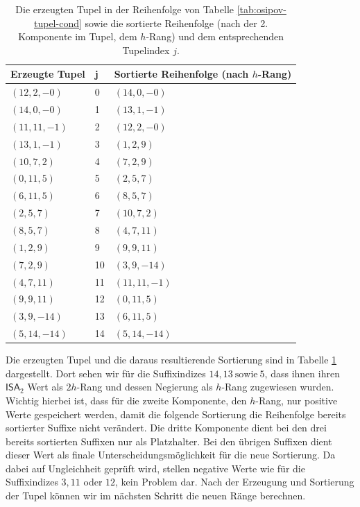 \begin{table}[]
\begin{tabular}{|l|l|l|}
\hline
Erzeugte Tupel & j  & Sortierte Reihenfolge (nach $h$-Rang) \\ \hline
$(12, 2, -0)$  & 0  & $(14,0,-0)$                           \\ \hline
$(14, 0, -0)$  & 1  & $(13,1,-1)$                           \\ \hline
$(11,11,-1)$   & 2  & $(12,2,-0)$                           \\ \hline
$(13,1,-1)$    & 3  & $(1,2,9)$                             \\ \hline
$(10,7,2)$     & 4  & $(7,2,9)$                             \\ \hline
$(0,11,5)$     & 5  & $(2,5,7)$                             \\ \hline
$(6,11,5)$     & 6  & $(8,5,7)$                             \\ \hline
$(2,5,7)$      & 7  & $(10,7,2)$                            \\ \hline
$(8,5,7)$      & 8  & $(4,7,11)$                            \\ \hline
$(1,2,9)$      & 9  & $(9,9,11)$                            \\ \hline
$(7,2,9)$      & 10 & $(3,9,-14)$                           \\ \hline
$(4,7,11)$     & 11 & $(11,11,-1)$                          \\ \hline
$(9,9,11)$     & 12 & $(0,11,5)$                            \\ \hline
$(3,9,-14)$    & 13 & $(6,11,5)$                            \\ \hline
$(5,14,-14)$   & 14 & $(5,14,-14)$                          \\ \hline
\end{tabular}
\caption{Die erzeugten Tupel in der Reihenfolge von Tabelle \ref{tab:osipov-tupel-cond} sowie die sortierte Reihenfolge (nach der 2. Komponente im Tupel, dem $h$-Rang) und dem entsprechenden Tupelindex $j$.}
\label{tab:osipov-tupel-sort}
\end{table}

Die erzeugten Tupel und die daraus resultierende Sortierung sind in Tabelle \ref{tab:osipov-tupel-sort} dargestellt. Dort sehen wir für die Suffixindizes $14, 13 ~\text{sowie}~ 5$, dass ihnen ihren $\mathsf{ISA}_2$ Wert als $2h$-Rang und dessen Negierung als $h$-Rang zugewiesen wurden. Wichtig hierbei ist, dass für die zweite Komponente, den $h$-Rang, nur positive Werte gespeichert werden, damit die folgende Sortierung die Reihenfolge bereits sortierter Suffixe nicht verändert. Die dritte Komponente dient bei den drei bereits sortierten Suffixen nur als Platzhalter. Bei den übrigen Suffixen dient dieser Wert als finale Unterscheidungsmöglichkeit für die neue Sortierung. Da dabei auf Ungleichheit geprüft wird, stellen negative Werte wie für die Suffixindizes $3, 11$ oder $12$, kein Problem dar. Nach der Erzeugung und Sortierung der Tupel können wir im nächsten Schritt die neuen Ränge berechnen.

